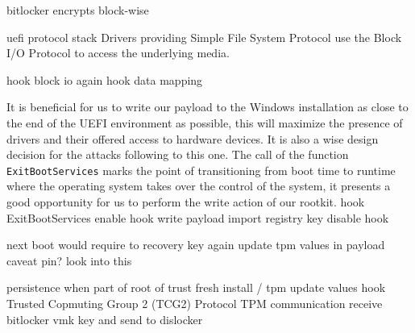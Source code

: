 bitlocker encrypts block-wise

uefi protocol stack
\cite[13.3.2 Partition Disocvery]{uefi-spec}
Drivers providing Simple File System Protocol use the Block I/O Protocol to access the underlying media.


hook block io
again hook data mapping

It is beneficial for us to write our payload to the Windows installation as close to the end of the UEFI environment as possible, this will maximize the presence of drivers and their offered access to hardware devices. It is also a wise design decision for the attacks following to this one. The call of the function \lstinline{ExitBootServices} marks the point of transitioning from boot time to runtime where the operating system takes over the control of the system, it presents a good opportunity for us to perform the write action of our rootkit.
\cite{exitbootservices-hooking}
hook ExitBootServices
enable hook
write payload
import registry key
disable hook

next boot would require to recovery key again
update tpm values in payload
\cite{microsoft-bitlocker-manage-bde}
caveat pin? look into this

persistence when part of root of trust
fresh install / tpm update values
hook Trusted Copmuting Group 2 (TCG2) Protocol
TPM communication
\cite[6.7.3]{tcg-efi-platform-spec}
receive bitlocker vmk key and send to dislocker
\cite{bde-format-spec}
\cite{tpm-sniffing}

